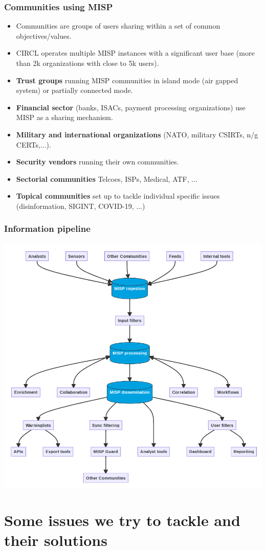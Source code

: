 \begin{frame}
 \frametitle{Communities using MISP}
 \begin{itemize}
	 \item Communities are groups of users sharing within a set of common objectives/values.
	 \item CIRCL operates multiple MISP instances with a significant user base (more than 2k organizations with close to 5k users).
         \item {\bf Trust groups} running MISP communities in island mode (air gapped system) or partially connected mode.
	 \item {\bf Financial sector} (banks, ISACs, payment processing organizations) use MISP as a sharing mechanism.
	 \item {\bf Military and international organizations} (NATO, military CSIRTs, n/g CERTs,...).
	 \item {\bf Security vendors} running their own communities.
	 \item {\bf Sectorial communities} Telcoes, ISPs, Medical, ATF, ...
         \item {\bf Topical communities} set up to tackle individual specific issues (disinformation, SIGINT, COVID-19, ...)
 \end{itemize}
\end{frame}


\begin{frame}
\frametitle{Information pipeline}
    \includegraphics[width=0.75\linewidth]{misp_data_flow.png}
\end{frame}


\section{Some issues we try to tackle and their solutions}

